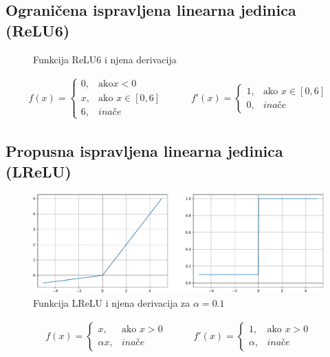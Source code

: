\documentclass[times, utf8, diplomski]{fer}
\def\otherwise{\textit{inače}}
\begin{document}
\subsection{Ograničena ispravljena linearna jedinica (ReLU6)}
\label{func:relu6}

\begin{figure}[H]
\centering
\caption{Funkcija ReLU6 i njena derivacija}
\label{fig:relu6}
\end{figure}

\begin{equation}
\label{eq:relu}
\begin{split}
f(x) = 
\begin{cases}
0,		& \text{ako} x < 0 \\
x,		& \text{ako } x \in [0, 6] \\
6,		& \otherwise
\end{cases}
\end{split}
\qquad
\begin{split}
f'(x) = 
\begin{cases}
1,		& \text{ako } x \in [0, 6] \\
0,		& \otherwise
\end{cases}
\end{split}
\end{equation}

\subsection{Propusna ispravljena linearna jedinica (LReLU)}

\begin{figure}[H]
\includegraphics[width=\textwidth]{LReLU.pdf}
\centering
\caption{Funkcija LReLU i njena derivacija za $\alpha=0.1$}
\label{fig:lrelu}
\end{figure}

\begin{equation}
\begin{split}
f(x) = 
\begin{cases}
x,			& \text{ako } x > 0 \\
\alpha x,	& \otherwise
\end{cases}
\end{split}
\qquad
\begin{split}
f'(x) = 
\begin{cases}
1,		& \text{ako } x > 0 \\
\alpha,	& \otherwise
\end{cases}
\end{split}
\end{equation}
\end{document}
